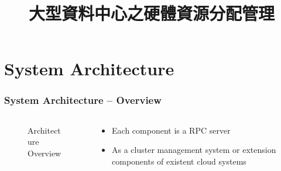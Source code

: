 \documentclass{beamer}
\title{大型資料中心之硬體資源分配管理}
\begin{document}
\begin{frame}
  \titlepage
  \label{title-page}
\end{frame}



\section{System Architecture}
\begin{frame}
  \frametitle{System Architecture -- Overview}
  \begin{columns}
    \begin{column}{.5\textwidth}
      \begin{figure}
        \resizebox{\linewidth}{!}{
          
        }
        \caption{Architecture Overview}
        \label{fig:archi-overview}
      \end{figure}
    \end{column}
    \begin{column}{.5\textwidth}
      \begin{itemize}
        \item Each component is a RPC server
        \item As a cluster management system or extension
          components of existent cloud systems
      \end{itemize}
    \end{column}
  \end{columns}
\end{frame}
\end{document}
